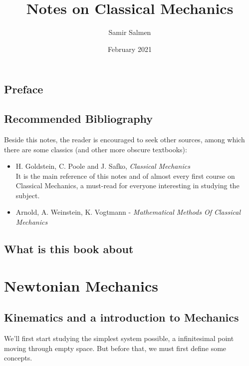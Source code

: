 \documentclass[english, a4paper,12pt]{Iart}
\theoremstyle{plain} %
\theoremstyle{remark}
\theoremstyle{definition}
\begin{document}
\author{Samir Salmen}
\title{Notes on Classical Mechanics}
\date{February 2021}








\maketitle

	\chapter*{Preface}
	
	\chapter*{Recommended Bibliography}
		Beside this notes, the reader is encouraged to seek other sources, among which there are some classics (and other more obscure textbooks):
		\smallskip
	
		
		\begin{itemize}
			\item H. Goldstein, C. Poole and J. Safko, \textit{Classical Mechanics}\\
			It is the main reference of this notes and of almost every first course on Classical Mechanics, a must-read for everyone interesting in studying the subject.\\
			
			
			\item Arnold, A. Weinstein, K. Vogtmann -
			\textit{Mathematical Methods Of Classical Mechanics}
		
		\end{itemize}
		
	\chapter*{What is this book about}


\part{Newtonian Mechanics}
	\chapter{Kinematics and a introduction to Mechanics}
		We'll first start studying the simplest system possible, a infinitesimal point moving through empty space. But before that, we must first define some concepts.
		
\end{document}
